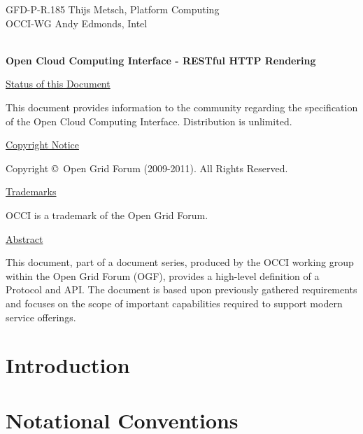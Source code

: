 \documentclass[10pt,a4paper]{article}
\begin{document}
\thispagestyle{empty}

GFD-P-R.185 \hfill Thijs Metsch, Platform Computing\\
OCCI-WG \hfill Andy Edmonds, Intel\\
\\

\vspace*{0.5in}

\begin{Large}
\textbf{Open Cloud Computing Interface - RESTful HTTP Rendering}
\end{Large}

\vspace*{0.5in}

\underline{Status of this Document}

This document provides information to the community regarding the
specification of the Open Cloud Computing Interface. Distribution is
unlimited.

\underline{Copyright Notice}

Copyright \copyright ~Open Grid Forum (2009-2011). All Rights Reserved.

\underline{Trademarks}

OCCI is a trademark of the Open Grid Forum.

\underline{Abstract}

This document, part of a document series, produced by the OCCI working
group within the Open Grid Forum (OGF), provides a high-level
definition of a Protocol and API. The document is based upon
previously gathered requirements and focuses on the scope of important
capabilities required to support modern service offerings.


\newpage
\tableofcontents
\newpage

\section{Introduction}


\section{Notational Conventions}

\end{document}
